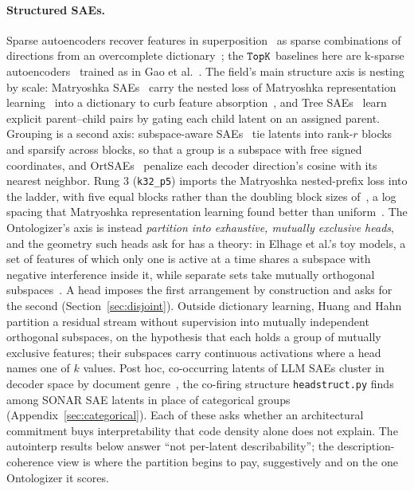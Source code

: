 \documentclass[11pt]{article}
\begin{document}
\paragraph{Structured SAEs.}
Sparse autoencoders recover features in superposition~\cite{elhage2022}
as sparse combinations of directions from an overcomplete
dictionary~\cite{cunningham2023,bricken2023}; the $\mathop{\mathtt{TopK}}\limits$ baselines here
are k-sparse autoencoders~\cite{makhzani2014} trained as in Gao et
al.~\cite{gao2024}. The field's main structure axis is nesting by scale:
Matryoshka SAEs~\cite{bussmann2025} carry the nested loss of Matryoshka
representation learning~\cite{kusupati2022} into a dictionary to curb
feature absorption~\cite{chanin2025}, and Tree SAEs~\cite{cao2026} learn
explicit parent--child pairs by gating each child latent on an assigned
parent. Grouping is a second axis: subspace-aware SAEs~\cite{dalili2026}
tie latents into rank-$r$ blocks and sparsify across blocks, so that a
group is a subspace with free signed coordinates, and
OrtSAEs~\cite{korznikov2025} penalize each decoder direction's cosine with
its nearest neighbor. Rung 3 (\texttt{k32\_p5}) imports the Matryoshka
nested-prefix loss into the ladder, with five equal blocks rather than the
doubling block sizes of~\cite{bussmann2025}, a log spacing that Matryoshka
representation learning found better than uniform~\cite{kusupati2022}.
The Ontologizer's axis is instead \emph{partition into exhaustive,
mutually exclusive heads}, and the geometry such heads ask for has a
theory: in Elhage et al.'s toy models, a set of features of which only one
is active at a time shares a subspace with negative interference inside
it, while separate sets take mutually orthogonal
subspaces~\cite{elhage2022}. A head imposes the first arrangement by
construction and asks for the second (Section~\ref{sec:disjoint}).
Outside dictionary learning, Huang and Hahn~\cite{huang2025decomposing}
partition a residual stream without supervision into mutually independent
orthogonal subspaces, on the hypothesis that each holds a group of
mutually exclusive features; their subspaces carry continuous activations
where a head names one of $k$ values. Post hoc, co-occurring latents of
LLM SAEs cluster in decoder space by document genre~\cite{li2024geometry},
the co-firing structure \texttt{headstruct.py} finds among SONAR SAE
latents in place of categorical groups (Appendix~\ref{sec:categorical}).
Each of these asks whether an architectural commitment buys
interpretability that code density alone does not explain. The autointerp
results below answer ``not per-latent describability''; the
description-coherence view is where the partition begins to pay,
suggestively and on the one Ontologizer it scores.
\end{document}
